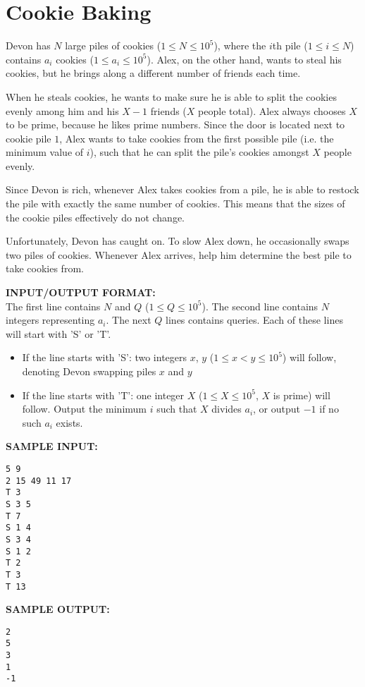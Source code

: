 \documentclass{article}
\begin{document}
\newcommand{\blank}{\vskip 3mm}
\setlength\parindent{0pt}
\renewcommand\thesection{\Alph{section}}

\setcounter{section}{7}
\section{Cookie Baking}

Devon has $ N $ large piles of cookies ($ 1 \leq N \leq 10^5 $), where the $i$th pile ($ 1 \leq i \leq N $) contains $a_i$ cookies ($ 1 \leq a_i \leq 10^5$). Alex, on the other hand, wants to steal his cookies, but he brings along a different number of friends each time.

When he steals cookies, he wants to make sure he is able to split the cookies evenly among him and his $ X-1 $ friends ($ X $ people total). Alex always chooses $X$ to be prime, because he likes prime numbers. Since the door is located next to cookie pile $ 1 $, Alex wants to take cookies from the first possible pile (i.e. the minimum value of $i$), such that he can split the pile's cookies amongst $ X $ people evenly.

Since Devon is rich, whenever Alex takes cookies from a pile, he is able to restock the pile with exactly the same number of cookies. This means that the sizes of the cookie piles effectively do not change.

Unfortunately, Devon has caught on. To slow Alex down, he occasionally swaps two piles of cookies. Whenever Alex arrives, help him determine the best pile to take cookies from.

\blank
\textbf{INPUT/OUTPUT FORMAT:}\\
The first line contains $ N $ and $Q$ ($1 \leq Q \leq 10^5$).
The second line contains $N$ integers representing $a_i$.
The next $Q$ lines contains queries. Each of these lines will start with 'S' or 'T'.
\begin{itemize}
    \item If the line starts with 'S': two integers $x$, $y$ ($1 \leq x < y \leq 10^5$) will follow, denoting Devon swapping piles $x$ and $y$
    \item If the line starts with 'T': one integer $X$ ($1 \leq X \leq 10^5$, $X$ is prime) will follow. Output the minimum $i$ such that $X$ divides $a_i$, or output $-1$ if no such $ a_i $ exists. 
\end{itemize}
\blank
\textbf{SAMPLE INPUT:}
\begin{verbatim}
5 9
2 15 49 11 17
T 3
S 3 5
T 7
S 1 4
S 3 4
S 1 2
T 2
T 3
T 13
\end{verbatim}
\textbf{SAMPLE OUTPUT:}
\begin{verbatim}
2
5
3
1
-1
\end{verbatim}
\end{document}
